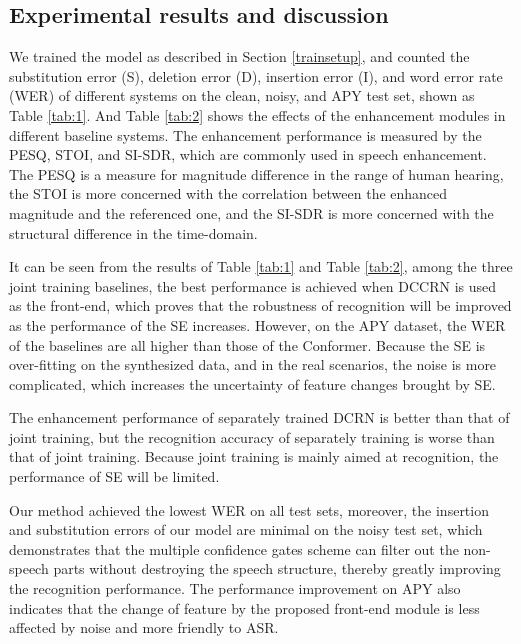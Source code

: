 \documentclass{article}
\begin{document}
	\subsection{Experimental results and discussion}
	We trained the model as described in Section \ref{trainsetup}, and counted the substitution error (S), deletion error (D), insertion error (I), and word error rate (WER) of different systems on the clean, noisy, and APY test set, shown as Table \ref{tab:1}. And Table \ref{tab:2} shows the effects of the enhancement modules in different baseline systems. The enhancement performance is measured by the PESQ, STOI, and SI-SDR, which are commonly used in speech enhancement. The PESQ is a measure for magnitude difference in the range of human hearing, the STOI is more concerned with the correlation between the enhanced magnitude and the referenced one, and the SI-SDR is more concerned with the structural difference in the time-domain.
	
	It can be seen from the results of Table \ref{tab:1} and Table \ref{tab:2}, among the three joint training baselines, the best performance is achieved when DCCRN is used as the front-end, which proves that the robustness of recognition will be improved as the performance of the SE increases. However, on the APY dataset, the WER of the baselines are all higher than those of the Conformer. Because the SE is over-fitting on the synthesized data, and in the real scenarios, the noise is more complicated, which increases the uncertainty of feature changes brought by SE.
	
	The enhancement performance of separately trained DCRN is better than that of joint training, but the recognition accuracy of separately training is worse than that of joint training. Because joint training is mainly aimed at recognition, the performance of SE will be limited.
	
	Our method achieved the lowest WER on all test sets, moreover, the insertion and substitution errors of our model are minimal on the noisy test set, which demonstrates that the multiple confidence gates scheme can filter out the non-speech parts without destroying the speech structure, thereby greatly improving the recognition performance. The performance improvement on APY also indicates that the change of feature by the proposed front-end module is less affected by noise and more friendly to ASR.
	
\end{document}
